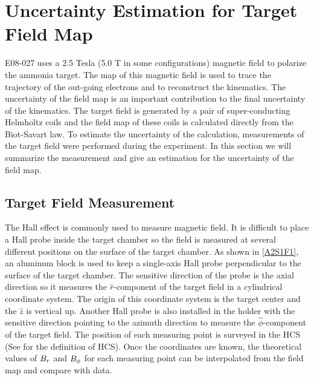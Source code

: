 
\chapter{Uncertainty Estimation for Target Field Map}
\label{A2}

E08-027 uses a 2.5 Tesla (5.0 T in some configurations) magnetic field to polarize the ammonia target. The map of this magnetic field is used to trace the trajectory of the out-going electrons and to reconstruct the kinematics. The uncertainty of the field map is an important contribution to the final uncertainty of the kinematics. The target field is generated by a pair of super-conducting Helmholtz coils and the field map of these coils is calculated directly from the Biot-Savart law. To estimate the uncertainty of the calculation, measurements of the target field were performed during the experiment. In this section we will summarize the measurement and give an estimation for the uncertainty of the field map.

\section{Target Field Measurement}
\label{A2S1}

The Hall effect is commonly used to measure magnetic field. It is difficult to place a Hall probe inside the target chamber so the field is measured at several different positions on the surface of the target chamber. As shown in \cref{A2S1F1}, an aluminum block is used to keep a single-axis Hall probe perpendicular to the surface of the target chamber. The sensitive direction of the probe is the axial direction so it measures the $\hat{r}$-component of the target field in a cylindrical coordinate system. The origin of this coordinate system is the target center and the $\hat{z}$ is vertical up. Another Hall probe is also installed in the holder with the sensitive direction pointing to the azimuth direction to measure the $\hat{\phi}$-component of the target field. The position of each measuring point is surveyed in the HCS (See  for the definition of HCS). Once the coordinates are known, the theoretical values of $B_r$ and $B_{\phi}$ for each measuring point can be interpolated from the field map and compare with data.

